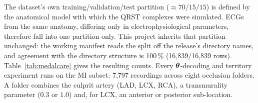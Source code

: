The dataset's own training/validation/test partition (${\approx}70/15/15$) is defined by the anatomical model with which the QRST complexes were simulated. ECGs from the same anatomy, differing only in electrophysiological parameters, therefore fall into one partition only. This project inherits that partition unchanged: the working manifest reads the split off the release's directory names, and agreement with the directory structure is 100\,\% (16,839/16,839 rows).  Table~\ref{tab:medalcare} gives the resulting counts. Every $\boldsymbol{\theta}$-decoding and territory experiment runs on the MI subset: 7,797 recordings across eight occlusion folders. A folder combines the culprit artery (LAD, LCX, RCA), a transmurality parameter ($0.3$ or $1.0$) and, for LCX, an anterior or posterior sub-location. 

